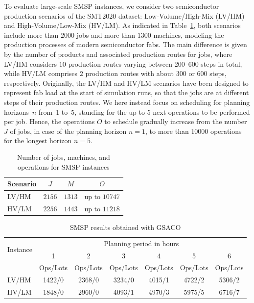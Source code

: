 To evaluate large-scale SMSP instances,
we consider two semiconductor production scenarios of the SMT2020 dataset:
Low-Volume/High-Mix (LV/HM) and High-Volume/Low-Mix (HV/LM).
As indicated in Table~\ref{tab:Dataset},
both scenarios include more than $2000$ jobs and more than $1300$ machines,
modeling the production processes of modern semiconductor fabs.
The main difference is given by the number of products and associated production routes for jobs, where LV/HM considers $10$ production routes varying between
$200$--$600$ steps in total, while HV/LM comprises $2$ production routes with about
$300$ or $600$ steps, respectively.
Originally, the LV/HM and HV/LM scenarios have been designed to represent fab load at the
start of simulation runs, so that the jobs are at different steps of their
production routes.
We here instead focus on scheduling for planning horizons~$n$ from~$1$ to~$5$,
standing for the up to $5$ next operations to be performed per job.
Hence, the operations $O$ to schedule gradually increase from the
number $J$ of jobs, in case of the planning horizon $n=1$,
to more than $10000$ operations %
for the longest %
horizon $n=5$.

\begin{table}[t]
	\caption{Number of jobs, machines, and operations for SMSP instances}\label{tab:Dataset} \centering
	\begin{tabular}{|l|c|c|c|}
		\hline
		Scenario & $J$    & $M$    & $O$              \\ \hline
		LV/HM    & $2156$ & $1313$ & up to $10747$    \\ 
		HV/LM    & $2256$ & $1443$ & up to $11218$    \\
		\hline
	\end{tabular}
\end{table}
%

\begin{table}[]
	\caption{SMSP results obtained with GSACO}	\label{tab:results-operations} \centering
	\begin{tabular}{|l|cccccc|}
		\hline
		\multicolumn{1}{|c|}{\multirow{2}{*}{Instance}} &
		\multicolumn{6}{c|}{Planning period in hours} \\ \cline{2-7} 
		\multicolumn{1}{|c|}{} &
		\multicolumn{1}{c|}{1} &
		\multicolumn{1}{c|}{2} &
		\multicolumn{1}{c|}{3} &
		\multicolumn{1}{c|}{4} &
		\multicolumn{1}{c|}{5} &
		6 \\ \hline &
		\multicolumn{1}{l|}{Ops/Lots} &
		\multicolumn{1}{l|}{Ops/Lots} &
		\multicolumn{1}{l|}{Ops/Lots} &
		\multicolumn{1}{l|}{Ops/Lots} &
		\multicolumn{1}{c|}{Ops/Lots} &
		\multicolumn{1}{l|}{Ops/Lots} \\ \cline{2-7}
		LV/HM &
		\multicolumn{1}{c|}{1422/0} &
		\multicolumn{1}{c|}{2368/0} &
		\multicolumn{1}{c|}{3234/0} &
		\multicolumn{1}{c|}{4015/1} &
		\multicolumn{1}{c|}{4722/2} &
		5306/2 \\ 
		HV/LM &
		\multicolumn{1}{c|}{1848/0} &
		\multicolumn{1}{c|}{2960/0} &
		\multicolumn{1}{c|}{4093/1} &
		\multicolumn{1}{c|}{4970/3} &
		\multicolumn{1}{c|}{5975/5} &
		6716/7 \\ \hline
	\end{tabular}%
\end{table}


